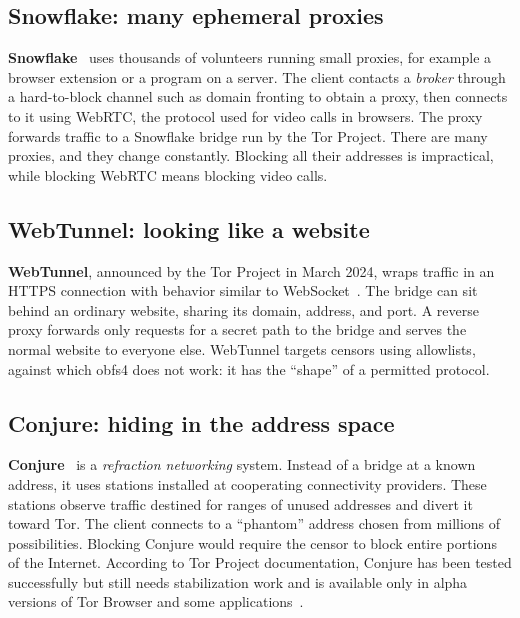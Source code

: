 \subsection{Snowflake: many ephemeral proxies}

\textbf{Snowflake}~\cite{bocovich2024snowflake} uses thousands of volunteers running small proxies, for example a browser extension or a program on a server. The client contacts a \emph{broker} through a hard-to-block channel such as domain fronting to obtain a proxy, then connects to it using WebRTC, the protocol used for video calls in browsers. The proxy forwards traffic to a Snowflake bridge run by the Tor Project. There are many proxies, and they change constantly. Blocking all their addresses is impractical, while blocking WebRTC means blocking video calls.

\subsection{WebTunnel: looking like a website}

\textbf{WebTunnel}, announced by the Tor Project in March 2024, wraps traffic in an HTTPS connection with behavior similar to WebSocket~\cite{torblogwebtunnel}. The bridge can sit behind an ordinary website, sharing its domain, address, and port. A reverse proxy forwards only requests for a secret path to the bridge and serves the normal website to everyone else. WebTunnel targets censors using allowlists, against which obfs4 does not work: it has the \enquote{shape} of a permitted protocol.

\subsection{Conjure: hiding in the address space}

\textbf{Conjure}~\cite{frolov2019conjure} is a \emph{refraction networking} system. Instead of a bridge at a known address, it uses stations installed at cooperating connectivity providers. These stations observe traffic destined for ranges of unused addresses and divert it toward Tor. The client connects to a \enquote{phantom} address chosen from millions of possibilities. Blocking Conjure would require the censor to block entire portions of the Internet. According to Tor Project documentation, Conjure has been tested successfully but still needs stabilization work and is available only in alpha versions of Tor Browser and some applications~\cite{torsupport}.

